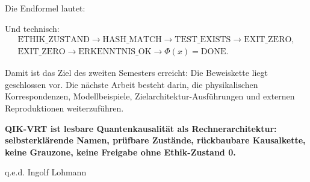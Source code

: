 \documentclass[11pt,a4paper,oneside]{scrartcl}
\theoremstyle{qikstyle}
\newcommand{\DONE}{\mathrm{DONE}}
\newcommand{\HASH}{\mathrm{HASH\_MATCH}}
\newcommand{\TEST}{\mathrm{TEST\_EXISTS}}
\newcommand{\EXIT}{\mathrm{EXIT\_ZERO}}
\newcommand{\ERK}{\mathrm{ERKENNTNIS\_OK}}
\newcommand{\ETH}{\mathrm{ETHIK\_ZUSTAND}}
\newcommand{\Phiop}{\Phi}
\newenvironment{merksatz}{\begin{center}\begin{minipage}{0.92\linewidth}\sffamily\bfseries}{\end{minipage}\end{center}}
\begin{document}
Die Endformel lautet:
\begin{center}
\end{center}

Und technisch:
\[
\boxed{
\begin{gathered}
\ETH \to \HASH \to \TEST \to \EXIT,\\
\EXIT \to \ERK \to \Phiop(x)=\DONE.
\end{gathered}}
\]

Damit ist das Ziel des zweiten Semesters erreicht: Die Beweiskette liegt geschlossen vor. Die nächste Arbeit besteht darin, die physikalischen Korrespondenzen, Modellbeispiele, Zielarchitektur-Ausführungen und externen Reproduktionen weiterzuführen.

\begin{merksatz}
QIK-VRT ist lesbare Quantenkausalität als Rechnerarchitektur: selbsterklärende Namen, prüfbare Zustände, rückbaubare Kausalkette, keine Grauzone, keine Freigabe ohne Ethik-Zustand 0.
\end{merksatz}

q.e.d. Ingolf Lohmann
\end{document}
